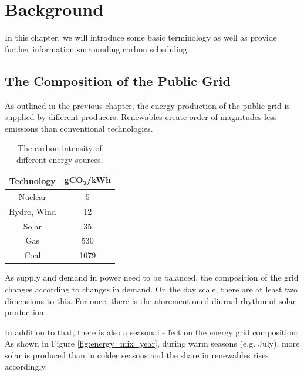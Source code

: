 \chapter{Background}
\label{chap:backgroud}

In this chapter, we will introduce some basic terminology as well as provide further information surrounding carbon scheduling.

\section{The Composition of the Public Grid}

As outlined in the previous chapter, the energy production of the public grid is supplied by different producers.
Renewables create order of magnitudes less emissions than conventional technologies.  

\begin{table}[h!]
    \centering
    \begin{tabular}{|c|c|}
    \hline
        Technology & gCO\textsubscript{2}/kWh \\ \hline
        Nuclear & 5 \\ \hline
        Hydro, Wind & 12 \\ \hline
        Solar & 35 \\ \hline
        Gas & 530 \\ \hline
        Coal & 1079 \\ \hline
    \end{tabular}
    \caption{The carbon intensity of different energy sources.}
    \label{tab:carbon_intensities}
\end{table}

As supply and demand in power need to be balanced, the composition of the grid changes according to changes in demand.
On the day scale, there are at least two dimensions to this. For once, there is the aforementioned diurnal rhythm of solar production.


In addition to that, there is also a seasonal effect on the energy grid composition:
As shown in Figure \ref{fig:energy_mix_year}, during warm seasons (e.g. July), more solar is produced than in colder seasons and the share in renewables rises accordingly.

